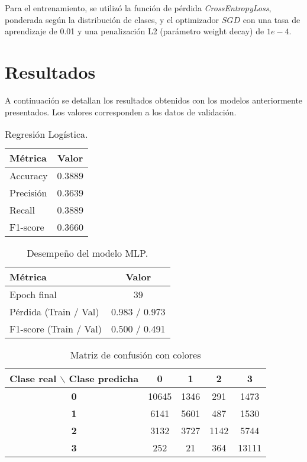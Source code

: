 \documentclass[12pt]{article}
\begin{document}
Para el entrenamiento, se utilizó la función de pérdida \textit{CrossEntropyLoss}, ponderada 
según la distribución de clases, y el optimizador $SGD$ con una tasa de aprendizaje de 0.01
y una penalización L2 (parámetro weight decay) de $1e-4$.


\section{Resultados}
A continuación se detallan los resultados obtenidos con los modelos anteriormente presentados. 
Los valores corresponden a los datos de validación.

\begin{table}[h]
    \centering
    \caption{Regresión Logística.}
    \begin{tabular}{l c}
        \toprule
        \textbf{Métrica} & \textbf{Valor} \\
        \midrule
        Accuracy   & 0.3889 \\
        Precisión  & 0.3639 \\
        Recall     & 0.3889 \\
        F1-score   & 0.3660 \\
        \bottomrule
    \end{tabular}
    \label{tab:logistica}
\end{table}

\begin{table}[h]
    \centering
    \caption{Desempeño del modelo MLP.}
    \begin{tabular}{l c}
        \toprule
        \textbf{Métrica} & \textbf{Valor} \\
        \midrule
        Epoch final             & 39 \\
        Pérdida (Train / Val)   & 0.983 / 0.973 \\
        F1-score (Train / Val)  & 0.500 / 0.491 \\
        \bottomrule
    \end{tabular}
    \label{tab:mlp}
\end{table}

\begin{table}[h!]
\centering
\begin{tabular}{c|cccc}
\rowcolor{gray!30} \textbf{Clase real $\backslash$ Clase predicha} & \textbf{0} & \textbf{1} & \textbf{2} & \textbf{3} \\
\hline
\textbf{0} & \cellcolor{yellow!50}10645 & 1346 & 291 & 1473 \\
\textbf{1} & 6141 & \cellcolor{yellow!50}5601 & 487 & 1530 \\
\textbf{2} & 3132 & 3727 & \cellcolor{yellow!50}1142 & 5744 \\
\textbf{3} & 252 & 21 & 364 & \cellcolor{yellow!50}13111 \\
\end{tabular}
\caption{Matriz de confusión con colores}
\end{table}
\end{document}
